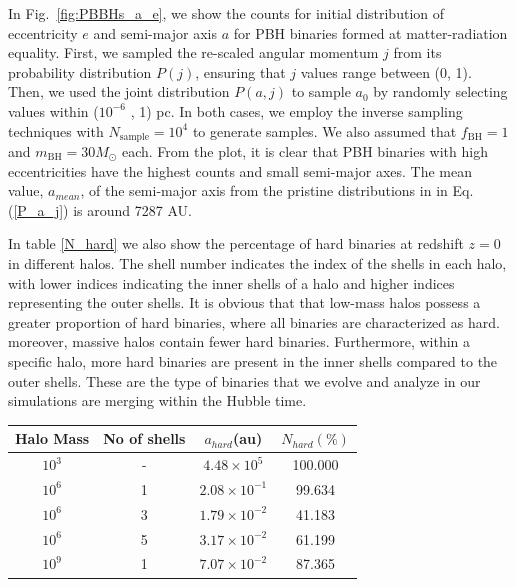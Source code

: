 \documentclass[aps, prd, reprint, nofootinbib]{revtex4-2}
\begin{document}
\begin{appendix}
In Fig.~\ref{fig:PBBHs_a_e}, we show the counts for initial distribution of eccentricity $e$ and semi-major axis $a$ for PBH binaries formed at matter-radiation equality. 
First, we sampled the re-scaled angular momentum $j$ from its probability distribution $ P(j) $, ensuring that $ j $ values range between (0, 1). Then, we used the joint distribution $ P(a, j) $ to sample $ a_0 $ by randomly selecting values within ($ 10^{-6}$ , 1) pc. In both cases, we employ the inverse sampling techniques with $ N_{\textrm{sample}} = 10^4 $ to generate samples. We also assumed that $f_{\textrm{BH}} = 1$ and $m_{\textrm{BH}}=30M_\odot$ each. From the plot, it is clear that PBH binaries with high eccentricities have the highest counts and small semi-major axes. The mean value, $a_{mean}$, of the semi-major axis from the pristine distributions in in Eq.(\ref{P_a_j}) is  around 7287 AU.

In  table \ref{N_hard}  we also show  the percentage of hard binaries at redshift $z=0$ in different  halos. The shell number indicates the index of the shells in each halo, with lower indices indicating the inner shells of a halo and higher indices representing the outer shells. It is obvious that that low-mass halos possess a greater proportion of hard binaries, where all binaries are characterized as hard. moreover, massive halos contain fewer hard binaries. Furthermore, within a specific halo, more hard binaries are present in the inner shells compared to the outer shells. These are the type of binaries that we evolve and analyze in our simulations are merging within the Hubble time.

\begin{table}[h!]
\centering
\begin{tabular}{|c|c|c|c|}
    \hline
           Halo Mass & No of shells & $a_{hard}$(au) & $N_{hard} ( \%)$  \\
        \hline
        $ 10^{3}$ & - & $4.48 \times 10^{5}$ & 100.000 \\
                \hline

        $ 10^{6}$ & 1 & $2.08 \times 10^{-1}$ & 99.634 \\
                \hline

        $ 10^{6}$ & 3 & $1.79 \times 10^{-2}$ & 41.183 \\
                \hline

        $ 10^{6}$ & 5 & $3.17 \times 10^{-2}$ & 61.199 \\
                \hline

        $ 10^{9}$ & 1 & $7.07 \times 10^{-2}$ & 87.365 \\
                \hline


\end{tabular}
\end{table}
\end{appendix}
\end{document}

